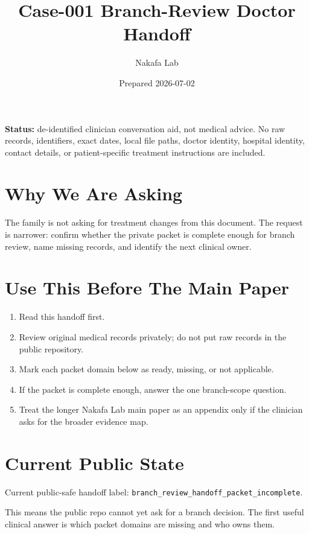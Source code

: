 \documentclass[11pt]{article}
\title{Case-001 Branch-Review Doctor Handoff}
\author{Nakafa Lab}
\date{Prepared 2026-07-02}
\begin{document}
\maketitle

\noindent\textbf{Status:} de-identified clinician conversation aid, not
medical advice. No raw records, identifiers, exact dates, local file paths,
doctor identity, hospital identity, contact details, or patient-specific
treatment instructions are included.

\section*{Why We Are Asking}

The family is not asking for treatment changes from this document. The request
is narrower: confirm whether the private packet is complete enough for branch
review, name missing records, and identify the next clinical owner.

\section*{Use This Before The Main Paper}

\begin{enumerate}
  \item Read this handoff first.
  \item Review original medical records privately; do not put raw records in
  the public repository.
  \item Mark each packet domain below as ready, missing, or not applicable.
  \item If the packet is complete enough, answer the one branch-scope question.
  \item Treat the longer Nakafa Lab main paper as an appendix only if the
  clinician asks for the broader evidence map.
\end{enumerate}

\section*{Current Public State}

Current public-safe handoff label:
\texttt{branch\_review\_handoff\_packet\_incomplete}.

\medskip

\noindent This means the public repo cannot yet ask for a branch decision. The
first useful clinical answer is which packet domains are missing and who owns
them.
\end{document}

